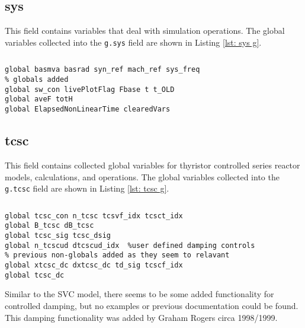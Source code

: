 \pagebreak
\subsection{sys}
This field contains variables that deal with simulation operations.
The global variables collected into the \verb|g.sys| field are shown in Listing \ref{lst: sys g}.

\begin{lstlisting}[caption={System Global Field Variables},label={lst: sys g}]
\end{lstlisting}\vspace{-2 em}
\begin{verbatim}
global basmva basrad syn_ref mach_ref sys_freq
% globals added
global sw_con livePlotFlag Fbase t t_OLD
global aveF totH
global ElapsedNonLinearTime clearedVars
\end{verbatim}

\subsection{tcsc}
This field contains collected global variables for thyristor controlled series reactor models, calculations, and operations.
The global variables collected into the \verb|g.tcsc| field are shown in Listing \ref{lst: tcsc g}.

\begin{lstlisting}[caption={TCSC Global Field Variables},label={lst: tcsc g}]
\end{lstlisting}\vspace{-2 em}
\begin{verbatim}
global tcsc_con n_tcsc tcsvf_idx tcsct_idx
global B_tcsc dB_tcsc
global tcsc_sig tcsc_dsig
global n_tcscud dtcscud_idx  %user defined damping controls
% previous non-globals added as they seem to relavant
global xtcsc_dc dxtcsc_dc td_sig tcscf_idx 
global tcsc_dc
\end{verbatim}

Similar to the SVC model, there seems to be some added functionality for controlled damping, but no examples or previous documentation could be found.
This damping functionality was added by Graham Rogers circa 1998/1999.

